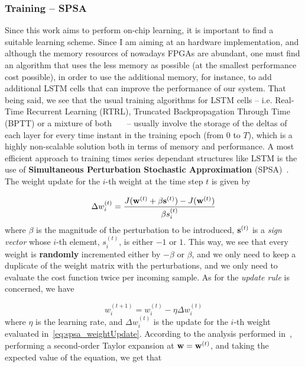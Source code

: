 \subsubsection{Training -- SPSA}\label{sec:training_lstm}
Since this work aims to perform on-chip learning, it is important to find a suitable learning scheme. Since I am aiming at an hardware implementation, and although the memory resources of nowadays FPGAs are abundant, one must find an algorithm that uses the less memory as possible (at the smallest performance cost possible), in order to use the additional memory, for instance, to add additional LSTM cells that can improve the performance of our system. 
That being said, we see that the usual training algorithms for LSTM cells -- i.e. Real-Time Recurrent Learning (RTRL), Truncated Backpropagation Through Time (BPTT) or a mixture of both~\cite{Graves05}~\cite{Hoch97}~\cite{Greff15} -- usually involve the storage of the deltas of each layer for every time instant in the training epoch (from $0$ to $T$), which is a highly non-scalable solution both in terms of memory and performance. A most efficient approach to training times series dependant structures like LSTM is the use of \textbf{Simultaneous Perturbation Stochastic Approximation} (SPSA)~\cite{Spall98}. The weight update for the $i$-th weight at the time step $t$ is given by 

\begin{equation}\label{eq:spsa_weightUpdate}
    \Delta w_i^{(t)} = \frac{J(\mathbf{w}^{(t)} + \beta \mathbf{s}^{(t)}) - J(\mathbf{w}^{(t)})}{\beta s_i^{(t)}}
\end{equation}
where $\beta$ is the magnitude of the perturbation to be introduced, $\mathbf{s}^{(t)}$ is a \textit{sign vector} whose $i$-th element, $s_i^{(t)}$, is either $-1$ or $1$. This way, we see that every weight is \textbf{randomly} incremented either by $-\beta$ or $\beta$, and we only need to keep a duplicate of the weight matrix with the perturbations, and we only need to evaluate the cost function twice per incoming sample. As for the \textit{update rule} is concerned, we have 

\begin{equation}\label{eq:spsa_updateRule}
    w_i^{(t+1)} = w_i^{(t)} - \eta \Delta w_i^{(t)}
\end{equation}
where $\eta$ is the learning rate, and $\Delta w_i^{(t)}$ is the update for the $i$-th weight evaluated in~\ref{eq:spsa_weightUpdate}.
According to the analysis performed in~\cite{Maeda05}, performing a second-order Taylor expansion at $\mathbf{w} = \mathbf{w}^{(t)}$, and taking the expected value of the equation, we get that

